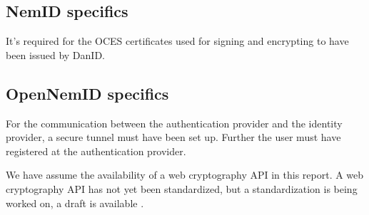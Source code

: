 \documentclass[twosided]{report}
\begin{document}
\subsection{NemID specifics}
It's required for the OCES certificates used for signing and encrypting to have been issued by DanID.

\subsection{OpenNemID specifics}
For the communication between the authentication provider and the identity provider, a secure tunnel must have been set up. Further the user must have registered at the authentication provider.
\par
We have assume the availability of a web cryptography API in this report. A web cryptography API has not yet been standardized, but a standardization is being worked on, a draft is available \cite{webcrypto}. 
\end{document}
